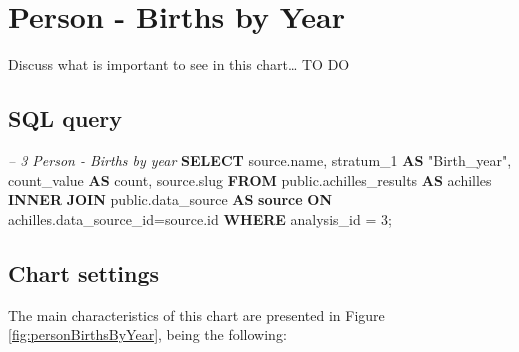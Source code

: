 \documentclass[]{book}
\newenvironment{Shaded}{\begin{snugshade}}{\end{snugshade}}
\newcommand{\KeywordTok}[1]{\textcolor[rgb]{0.13,0.29,0.53}{\textbf{#1}}}
\newcommand{\DecValTok}[1]{\textcolor[rgb]{0.00,0.00,0.81}{#1}}
\newcommand{\CommentTok}[1]{\textcolor[rgb]{0.56,0.35,0.01}{\textit{#1}}}
\newcommand{\OtherTok}[1]{\textcolor[rgb]{0.56,0.35,0.01}{#1}}
\newcommand{\FunctionTok}[1]{\textcolor[rgb]{0.00,0.00,0.00}{#1}}
\newcommand{\NormalTok}[1]{#1}
\begin{document}
\section{Person - Births by Year}\label{person---births-by-year}

Discuss what is important to see in this chart\ldots{} TO DO

\subsection{SQL query}\label{sql-query-8}

\begin{Shaded}
\begin{Highlighting}[]
\CommentTok{-- 3  Person - Births by year}
\KeywordTok{SELECT}\NormalTok{ source.name,}
\NormalTok{       stratum_1 }\KeywordTok{AS} \OtherTok{"Birth_year"}\NormalTok{,}
\NormalTok{       count_value }\KeywordTok{AS} \FunctionTok{count}\NormalTok{, }
\NormalTok{       source.slug}
\KeywordTok{FROM}\NormalTok{ public.achilles_results }\KeywordTok{AS}\NormalTok{ achilles }\KeywordTok{INNER} \KeywordTok{JOIN} 
\NormalTok{      public.data_source }\KeywordTok{AS} \KeywordTok{source} \KeywordTok{ON} 
\NormalTok{    achilles.data_source_id=source.id}
\KeywordTok{WHERE}\NormalTok{ analysis_id = }\DecValTok{3}\NormalTok{;}
\end{Highlighting}
\end{Shaded}

\subsection{Chart settings}\label{chart-settings-8}

The main characteristics of this chart are presented in Figure
\ref{fig:personBirthsByYear}, being the following:
\end{document}
